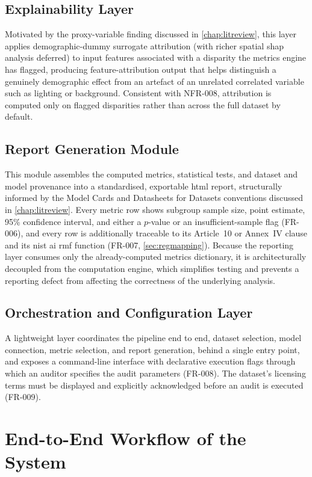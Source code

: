 \subsection{Explainability Layer}
Motivated by the proxy-variable finding discussed in \cref{chap:litreview}, this layer applies demographic-dummy surrogate attribution (with richer spatial \gls{shap} analysis deferred) to input features associated with a disparity the metrics engine has flagged, producing feature-attribution output that helps distinguish a genuinely demographic effect from an artefact of an unrelated correlated variable such as lighting or background. Consistent with NFR-008, attribution is computed only on flagged disparities rather than across the full dataset by default.

\subsection{Report Generation Module}
This module assembles the computed metrics, statistical tests, and dataset and model provenance into a standardised, exportable \gls{html} report, structurally informed by the Model Cards and Datasheets for Datasets conventions discussed in \cref{chap:litreview}. Every metric row shows subgroup sample size, point estimate, 95\% confidence interval, and either a $p$-value or an insufficient-sample flag (FR-006), and every row is additionally traceable to its Article~10 or Annex~IV clause and its \gls{nist} \gls{ai} \gls{rmf} function (FR-007, \cref{sec:regmapping}). Because the reporting layer consumes only the already-computed metrics dictionary, it is architecturally decoupled from the computation engine, which simplifies testing and prevents a reporting defect from affecting the correctness of the underlying analysis.

\subsection{Orchestration and Configuration Layer}
A lightweight layer coordinates the pipeline end to end, dataset selection, model connection, metric selection, and report generation, behind a single entry point, and exposes a command-line interface with declarative execution flags through which an auditor specifies the audit parameters (FR-008). The dataset's licensing terms must be displayed and explicitly acknowledged before an audit is executed (FR-009).

\section{End-to-End Workflow of the System}
\label{sec:workflow}

